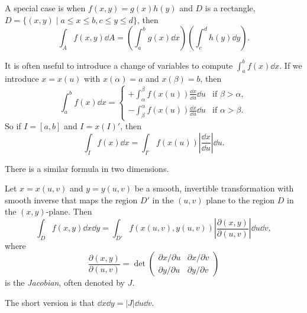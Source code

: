 \documentclass[a4paper]{scrreprt}
\begin{document}
A special case is when $f(x, y) = g(x)h(y)$ and $D$ is a rectangle, $D = \{(x, y) \mid a \leq x \leq b, c \leq y \leq d \}$, then
$$
\int_A f(x, y) \dd A = \left(\int_{a}^b g(x) \dd x\right)\left(\int_c^d h(y) \dd y\right).
$$

It is often useful to introduce a change of variables to compute $\int_a^b f(x) \dd x$.
If we introduce $x = x(u)$ with $x(\alpha) = a$ and $x(\beta) = b$, then
$$
\int_a^b f(x)\dd x = \begin{cases}
	+ \int_\alpha^\beta f(x(u)) \frac{\dd x}{\dd u} \dd u &\mbox{if } \beta > \alpha, \\
	- \int_\beta^\alpha f(x(u)) \frac{\dd x}{\dd u} \dd u  &\mbox{if } \alpha > \beta.
   \end{cases}
$$
So if $I = [a, b]$ and $I = x(I)'$, then
$$
\int_I f(x) \dd x = \int_{I'} f(x(u)) \left|\frac{\dd x}{\dd u}\right| \dd u.
$$

There is a similar formula in two dimensions.

\begin{proposition}
	Let $x = x(u, v)$ and $y = y(u, v)$ be a smooth, invertible transformation with smooth inverse that maps the region $D'$ in the $(u, v)$ plane to the region $D$ in the $(x, y)$-plane.
	Then
	$$
	\int_D f(x, y) \dd x \dd y = \int_{D'} f(x(u, v), y(u, v)) \left|\frac{\partial(x, y)}{\partial(u, v)}\right| \dd u \dd v,
	$$
	where
	$$
	\frac{\partial (x, y)}{\partial (u, v)} = \det\begin{pmatrix}
		\partial x/\partial u & \partial x / \partial v \\
		\partial y / \partial u & \partial y / \partial v
	\end{pmatrix}
	$$
	is the \emph{Jacobian}, often denoted by $J$.
\end{proposition}

The short version is that $\dd x \dd y = |J| \dd u \dd v$.
\end{document}
